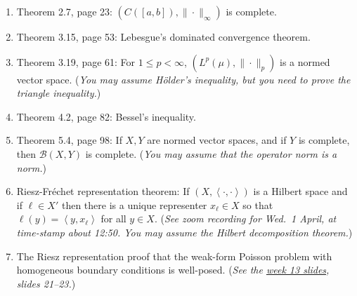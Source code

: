 \documentclass[12pt]{amsart}
\newcommand{\ip}[2]{\left<#1,#2\right>}
\begin{document}
\bigskip
\renewcommand{\labelenumi}{\textbf{T\arabic{enumi}.}}
\setlength{\leftmargini}{26pt}
\begin{enumerate}
\setlength{\itemsep}{7pt}
\item Theorem 2.7, page 23: $(C([a,b]), \|\cdot\|_\infty)$ is complete.
\item Theorem 3.15, page 53: Lebesgue's dominated convergence theorem.
\item Theorem 3.19, page 61: For $1\le p < \infty$, $(L^p(\mu), \|\cdot\|_p)$ is a normed vector space.  (\emph{You may assume H\"older's inequality, but you need to prove the triangle inequality.})
\item Theorem 4.2, page 82: Bessel's inequality.
\item Theorem 5.4, page 98: If $X,Y$ are normed vector spaces, and if $Y$ is complete, then $\mathcal{B}(X,Y)$ is complete.  (\emph{You may assume that the operator norm is a norm.})
\item Riesz-Fr\'echet representation theorem:  If $(X,\ip{\cdot}{\cdot})$ is a Hilbert space and if $\ell \in X'$ then there is a unique representer $x_\ell \in X$ so that $\ell(y) = \ip{y}{x_\ell}$ for all $y\in X$.  (\emph{See zoom recording for Wed.~1 April, at time-stamp about 12:50.  You may assume the Hilbert decomposition theorem.})
\item The Riesz representation proof that the weak-form Poisson problem with homogeneous boundary conditions is well-posed.  (\emph{See the \href{https://bueler.github.io/fa/assets/slides/S26/week13.pdf}{week 13 slides}, slides 21--23.})
\end{enumerate}
\end{document}
